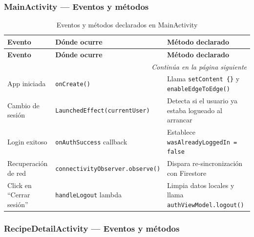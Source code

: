 \documentclass[stu, 12pt, letterpaper, donotrepeattitle, floatsintext, natbib]{apa7}
\begin{document}
\subsubsection{MainActivity --- Eventos y métodos}

\begin{longtable}{@{}p{2.5cm}p{4cm}p{9cm}@{}}
\caption{Eventos y métodos declarados en MainActivity}
\label{tab:evmainactivity}\\
\toprule
\textbf{Evento} & \textbf{Dónde ocurre} & \textbf{Método declarado} \\
\midrule
\endfirsthead
\toprule
\textbf{Evento} & \textbf{Dónde ocurre} & \textbf{Método declarado} \\
\midrule
\endhead
\midrule
\multicolumn{3}{r}{\small\textit{Continúa en la página siguiente}}\\
\endfoot
\bottomrule
\endlastfoot
App iniciada & \texttt{onCreate()} & Llama \texttt{setContent \{\}} y \texttt{enableEdgeToEdge()} \\[3pt]
Cambio de sesión & \texttt{LaunchedEffect(currentUser)} & Detecta si el usuario ya estaba logueado al arrancar \\[3pt]
Login exitoso & \texttt{onAuthSuccess} callback & Establece \texttt{wasAlreadyLoggedIn = false} \\[3pt]
Recuperación de red & \texttt{connectivityObserver.observe()} & Dispara re-sincronización con Firestore \\[3pt]
Click en ``Cerrar sesión'' & \texttt{handleLogout} lambda & Limpia datos locales y llama \texttt{authViewModel.logout()} \\
\end{longtable}

\subsubsection{RecipeDetailActivity --- Eventos y métodos}
\end{document}
